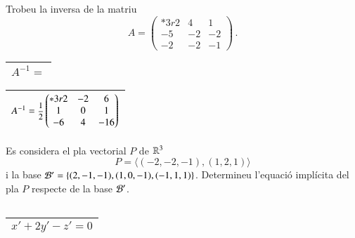 \documentclass[11pt,catalan]{article}
\begin{document}
\begin{enunciat}
Trobeu la inversa de la matriu 
\[
  A = \begin{pmatrix}{*{3}r} 2 & 4 & 1\\ -5 & -2 & -2\\ -2 & -2 & -1\end{pmatrix}\,.
\]
\end{enunciat}

\begin{quadricula}
\begin{tabular}{|L{5cm}{1.25cm}|}
\hline
$A^{-1}=$ \\
\hline
\end{tabular}
\end{quadricula}

\begin{solucio}
\begin{center}
\begin{tabular}{|C{5cm}{1.25cm}|}
\hline
$A^{-1}=\deufrac{1}{2}\begin{pmatrix}{*{3}r} 2 & -2 & 6\\ 1 & 0 & 1\\ -6 & 4 & -16\end{pmatrix}$ \\
\hline
\end{tabular}
\end{center}
\end{solucio}


\begin{enunciat}
Es considera el pla vectorial $P$ de $\rn 3$
\[
  P = \langle (-2,-2,-1), (1,2,1) \rangle
\]
i la base $\cal B'=\{(2,-1,-1),(1,0,-1),(-1,1,1)\}$. Determineu l'equació implícita del pla $P$ respecte de la base $\cal B'$.
\end{enunciat}

\begin{quadricula}
\begin{tabular}{|C{5cm}{0.5cm}|}
\hline
 \\
\hline
\end{tabular}
\end{quadricula}

\begin{solucio}
\begin{center}
\begin{tabular}{|C{5cm}{0.5cm}|}
\hline
$x' + 2 y' - z' = 0$ \\
\hline
\end{tabular}
\end{center}
\end{solucio}
\end{document}
